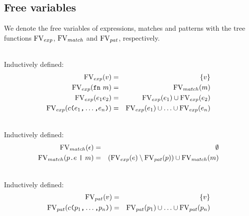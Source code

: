 

\subsection{Free variables}\label{sec:free-variables}

We denote the free variables of expressions, matches and patterns with the tree
functions $\mathrm{FV}_{exp}$, $\mathrm{FV}_{match}$ and $\mathrm{FV}_{pat}$, respectively.

\begin{definition}\ \\
  Inductively defined:
  \begin{eqnarray}
    \mathrm{FV}_{exp} (v) &=& \{v\} \\
    \mathrm{FV}_{exp} (\texttt{fn}\  m) &=& \mathrm{FV}_{match} (m) \\
    \mathrm{FV}_{exp} (e_1e_2) &=& \mathrm{FV}_{exp} (e_1) \cup \mathrm{FV}_{exp} (e_2) \\
    \mathrm{FV}_{exp} (c\texttt{(}e_1\texttt{,} \ldots \texttt{,} e_n \texttt{)}) &=& \mathrm{FV}_{exp}
    (e_1) \cup \ldots \cup \mathrm{FV}_{exp} (e_n)
  \end{eqnarray}
\end{definition}

\begin{definition}\ \\
  Inductively defined:
  \begin{eqnarray}
    \mathrm{FV}_{match} (\epsilon) &=& \emptyset \\
    \mathrm{FV}_{match} (p\texttt{.}e\ \texttt{|}\ m) &=& \left( \mathrm{FV}_{exp}(e) \setminus
      \mathrm{FV}_{pat}(p) \right) \cup \mathrm{FV}_{match} (m)
  \end{eqnarray}
\end{definition}

\begin{definition} \ \\
  Inductively defined:
  \begin{eqnarray}
    \mathrm{FV}_{pat} (v) &=& \{v\} \\
    \mathrm{FV}_{pat} (c\texttt{(}p_1\texttt{,} \ldots \texttt{,} p_n\texttt{)}) &=& \mathrm{FV}_{pat} (p_1)
    \cup \ldots \cup \mathrm{FV}_{pat} (p_n)
  \end{eqnarray}
\end{definition}

